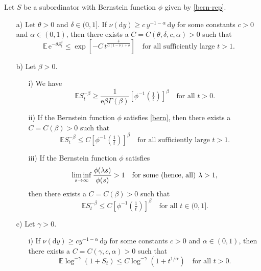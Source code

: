 \documentclass{aptpub}
\newcommand\EE{\mathds E}
\newcommand\dup{\mathrm{d}}
\newcommand\eup{\mathrm{e}}                                %
\numberwithin{equation}{section}
\begin{document}
\begin{thm}\label{moments}
Let $S$ be a subordinator with Bernstein function $\phi$ given by \eqref{bern-rep}.

\begin{enumerate}
\item[\upshape a)]
    Let $\theta>0$ and $\delta\in(0,1]$. If $\nu(\dup y)\geq c\,y^{-1-\alpha}\,\dup y$ for some constants $c>0$ and $\alpha\in(0,1)$, then there exists a $C=C(\theta,\delta,c,\alpha)>0$ such that
    $$
        \EE\,\eup^{-\theta S_t^\delta}
        \leq\exp\left[
            -C\,t^{
            \frac{\delta}{\alpha(1-\delta)+\delta}
            }
        \right]
        \quad\text{for all sufficiently large $t>1$}.
    $$


\item[\upshape b)]
        Let $\beta>0$.
        \begin{enumerate}
        \item[\upshape i)]
            We have
            $$
                \EE S_t^{-\beta}
                \geq
                \frac{1}{\eup\beta\Gamma(\beta)}
                \left[\phi^{-1}\left(\tfrac1t\right)
                \right]^\beta\quad
                \text{for all $t>0$}.
            $$

        \item[\upshape ii)]
            If the Bernstein function $\phi$ satisfies \eqref{bern}, then there exists a $C=C(\beta)>0$ such that
            $$
                \EE S_t^{-\beta}\leq C\left[
                \phi^{-1}\left(\tfrac1t\right)\right]^\beta
                \quad \text{for all sufficiently large $t>1$}.
            $$

        \item[\upshape iii)]
            If the Bernstein function $\phi$ satisfies
            \begin{equation*}
                \liminf_{s\to\infty}
                \frac{\phi(\lambda s)}{\phi(s)}>1
                \quad \text{for some
                {\upshape(}hence, all{\upshape)} $\lambda>1$},
            \end{equation*}
            then there exists a $C=C(\beta)>0$ such that
            $$
                \EE S_t^{-\beta}\leq
                C\left[
                \phi^{-1}\left(\tfrac1t\right)\right]^\beta
                \quad \text{for all $t\in(0,1]$}.
            $$
        \end{enumerate}



\item[\upshape c)]
        Let $\gamma>0$.
        \begin{enumerate}
        \item[\upshape i)]
            If $\nu(\dup y)\geq cy^{-1-\alpha}\,\dup y$ for some constants $c>0$ and $\alpha\in(0,1)$, then there exists a $C=C(\gamma,c,\alpha)>0$ such that
            $$
                \EE\log^{-\gamma}(1+S_t)
                \leq C\log^{-\gamma}\left(1+t^{1/\alpha}\right)
                \quad \text{for all $t>0$}.
            $$


\end{enumerate}
\end{enumerate}
\end{thm}
\end{document}
